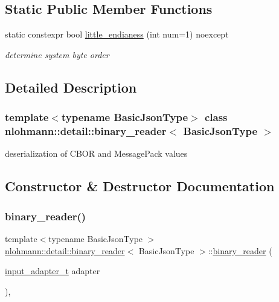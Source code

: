 \subsection*{Static Public Member Functions}
\begin{DoxyCompactItemize}
\item 
static constexpr bool \mbox{\hyperlink{classnlohmann_1_1detail_1_1binary__reader_a1d8f70f95d241354f86a0b9ae711c1c3}{little\+\_\+endianess}} (int num=1) noexcept
\begin{DoxyCompactList}\small\item\em determine system byte order \end{DoxyCompactList}\end{DoxyCompactItemize}


\subsection{Detailed Description}
\subsubsection*{template$<$typename Basic\+Json\+Type$>$\newline
class nlohmann\+::detail\+::binary\+\_\+reader$<$ Basic\+Json\+Type $>$}

deserialization of C\+B\+OR and Message\+Pack values 

\subsection{Constructor \& Destructor Documentation}
\mbox{\label{classnlohmann_1_1detail_1_1binary__reader_a7e643baadaf4c31718cd74833bdd542f}} 
\subsubsection{\texorpdfstring{binary\+\_\+reader()}{binary\_reader()}}
{\footnotesize\ttfamily template$<$typename Basic\+Json\+Type $>$ \\
\mbox{\hyperlink{classnlohmann_1_1detail_1_1binary__reader}{nlohmann\+::detail\+::binary\+\_\+reader}}$<$ Basic\+Json\+Type $>$\+::\mbox{\hyperlink{classnlohmann_1_1detail_1_1binary__reader}{binary\+\_\+reader}} (\begin{DoxyParamCaption}\item[{\mbox{\hyperlink{namespacenlohmann_1_1detail_ae132f8cd5bb24c5e9b40ad0eafedf1c2}{input\+\_\+adapter\+\_\+t}}}]{adapter }\end{DoxyParamCaption})\hspace{0.3cm}{\ttfamily [inline]}, {\ttfamily [explicit]}}



